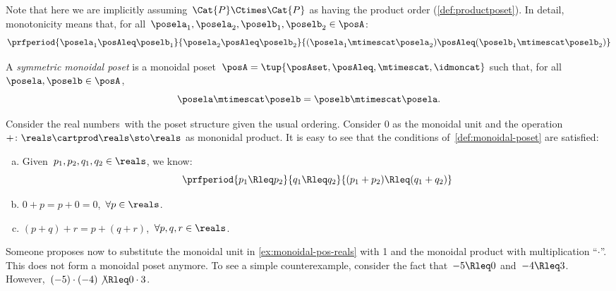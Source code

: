 Note that here we are implicitly assuming~$\Cat{P} \Ctimes \Cat{P}$ as having the product order (\cref{def:productposet}).
In detail, monotonicity means that, for all~$\posela_1, \posela_2, \poselb_1, \poselb_2 \in \posA$:
\begin{equation}
	\prfperiod{\posela_1 \posAleq \poselb_1}{\posela_2 \posAleq \poselb_2}{ (\posela_1 \mtimescat  \posela_2) \posAleq  (\poselb_1 \mtimescat  \poselb_2)}
\end{equation}

\begin{ctdefinition}
	\label{def:sym-monoidal-poset}
	A \emph{symmetric monoidal poset} is a monoidal poset~$\posA=\tup{\posAset, \posAleq, \mtimescat, \idmoncat}$ such that, for all~$\posela, \poselb \in \posA$,
	\begin{equation}
		\posela \mtimescat \poselb = \poselb \mtimescat \posela.
	\end{equation}
\end{ctdefinition}

\begin{example}
	\label{ex:monoidal-pos-reals}
	Consider the real numbers~\reals with the poset structure given the usual ordering.
	Consider 0 as the monoidal unit and the operation~$+\colon \reals\cartprod \reals\sto \reals$ as mononidal product.
	It is easy to see that the conditions of~\cref{def:monoidal-poset} are satisfied:
	\begin{enumerate}[(a)]
		\item Given~$p_1,p_2,q_1,q_2\in \reals$, we know:
		      \begin{equation*}
			      \prfperiod{
				      p_1\Rleq  p_2
			      }{
				      q_1\Rleq  q_2
			      }{
				      (p_1+p_2) \Rleq  (q_1+q_2)
			      }
		      \end{equation*}
		\item $0+p=p+0=0$,~$\forall p\in \reals$.
		\item $(p+q)+r=p+(q+r)$,~$\forall p,q,r\in \reals$.
	\end{enumerate}
\end{example}

\begin{counterexample}
	Someone proposes now to substitute the monoidal unit in \cref{ex:monoidal-pos-reals} with 1 and the monoidal product with multiplication ``$\cdot$''.
	This does not form a monoidal poset anymore.
	To see a simple counterexample, consider the fact that~$-5\Rleq 0$ and~$-4\Rleq 3$.
	However,~$(-5)\cdot (-4) \not{\Rleq} 0 \cdot 3$.
\end{counterexample}

